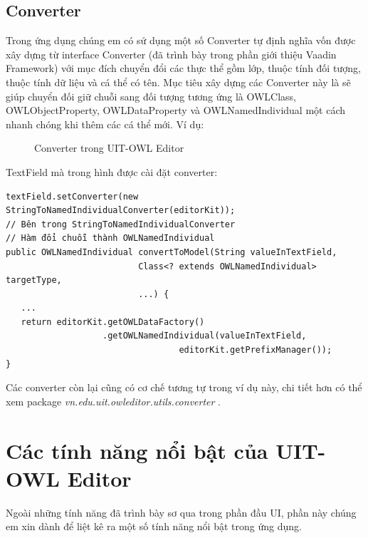 \subsection{Converter}
Trong ứng dụng chúng em có sử dụng một số Converter tự định nghĩa vốn được xây dựng từ interface Converter (đã trình bày trong phần giới thiệu Vaadin Framework) với mục đích chuyển đổi các thực thể gồm lớp, thuộc tính đối tượng, thuộc tính dữ liệu và cá thể có tên. Mục tiêu xây dựng các Converter này là sẽ giúp chuyển đối giữ chuỗi sang đối tượng tương ứng là OWLClass, OWLObjectProperty, OWLDataProperty và OWLNamedIndividual một cách nhanh chóng khi thêm các cá thể mới. Ví dụ:
\begin{figure}[h!]
	\centering
	\caption{Converter trong UIT-OWL Editor\label{overflow}}
\end{figure}
TextField mà trong hình được cài đặt converter:
\begin{verbatim}
textField.setConverter(new StringToNamedIndividualConverter(editorKit));
// Bên trong StringToNamedIndividualConverter 
// Hàm đổi chuỗi thành OWLNamedIndividual
public OWLNamedIndividual convertToModel(String valueInTextField,
                          Class<? extends OWLNamedIndividual> targetType,
                          ...) {
   ...
   return editorKit.getOWLDataFactory()
                   .getOWLNamedIndividual(valueInTextField,
                                  editorKit.getPrefixManager());
}                          
\end{verbatim}
Các converter còn lại cũng có cơ chế tương tự trong ví dụ này, chi tiết hơn có thể xem package \textit{vn.edu.uit.owleditor.utils.converter} \cite{owleditorSrc}.

\section{Các tính năng nổi bật của UIT-OWL Editor}
Ngoài những tính năng đã trình bày sơ qua trong phần đầu UI, phần này chúng em xin dành để liệt kê ra một số tính năng nổi bật trong ứng dụng.

